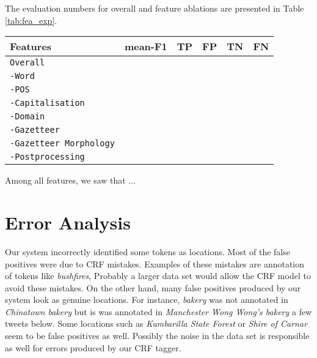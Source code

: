 \documentclass[11pt]{article}
\newcommand{\myex}[1]{\textit{#1}}
\newcommand{\feature}[1]{\texttt{#1}\xspace}
\newcommand{\tabref}[2][]{Table#1 \ref{#2}}
\begin{document}
The evaluation numbers for overall and feature ablations are presented in \tabref{tab:fea_exp}.
\begin{table*}[!htbp]
\begin{center}
\begin{tabular}{lccccc}
\hline 
Features                                     & mean-F1 & TP & FP & TN & FN \\ 
\hline
\feature{Overall}                            & & & & &  \\
\feature{-Word}                              & & & & &  \\
\feature{-POS}                               & & & & &  \\
\feature{-Capitalisation}                    & & & & &  \\
\feature{-Domain}                            & & & & &  \\
\feature{-Gazetteer}                         & & & & &  \\
\feature{-Gazetteer Morphology}              & & & & &  \\
\feature{-Postprocessing}                    & & & & &  \\
\hline
\end{tabular}
\end{center}
\caption{Overall experiment results and feature ablations}
\label{tab:fea_exp}
\end{table*}

Among all features, we saw that ...

\section{Error Analysis}
\label{sec:error_analysis}

Our system incorrectly identified some tokens as locations.
Most of the false positives were due to CRF mistakes.
Examples of these mistakes are annotation of tokens like \myex{bushfires}, 
Probably a larger data set would allow the CRF model to avoid these mistakes.
On the other hand, many false positives produced by our system look as genuine locations.
For instance, \myex{bakery} was not annotated in \myex{Chinatown bakery} but is was annotated in \myex{Manchester Wong Wong's bakery} a few tweets below.
Some locations such as \myex{Kumbarilla State Forest} or \myex{Shire of Carnar} seem to be false positives as well.
Possibly the noise in the data set is responsible as well for errors produced by our CRF tagger.
\end{document}

